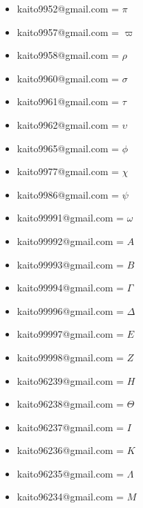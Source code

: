 \documentclass[12pt, a4paper] {article} %
\begin{document}
\begin{itemize}
		\item kaito9952@gmail.com = $\pi$ \\
		\item kaito9957@gmail.com = $\varpi$ \\
		\item kaito9958@gmail.com = $\rho$ \\
		\item kaito9960@gmail.com = $\sigma$ \\
		\item kaito9961@gmail.com = $\tau$ \\
		\item kaito9962@gmail.com = $\upsilon$ \\
		\item kaito9965@gmail.com = $\phi$ \\
		\item kaito9977@gmail.com = $\chi$ \\
		\item kaito9986@gmail.com = $\psi$ \\
		\item kaito99991@gmail.com = $\omega$ \\
		\item kaito99992@gmail.com = $A$ \\
		\item kaito99993@gmail.com = $B$ \\
		\item kaito99994@gmail.com = $\Gamma$ \\
		\item kaito99996@gmail.com = $\Delta$ \\
		\item kaito99997@gmail.com = $E$ \\
		\item kaito99998@gmail.com =  $Z$ \\
		\item kaito96239@gmail.com =  $H$ \\
		\item kaito96238@gmail.com =  $\Theta$ \\
		\item kaito96237@gmail.com =  $I$ \\
		\item kaito96236@gmail.com =  $K$ \\
		\item kaito96235@gmail.com =  $\Lambda$ \\
		\item kaito96234@gmail.com =  $M$ \\

\end{itemize}
\end{document}
